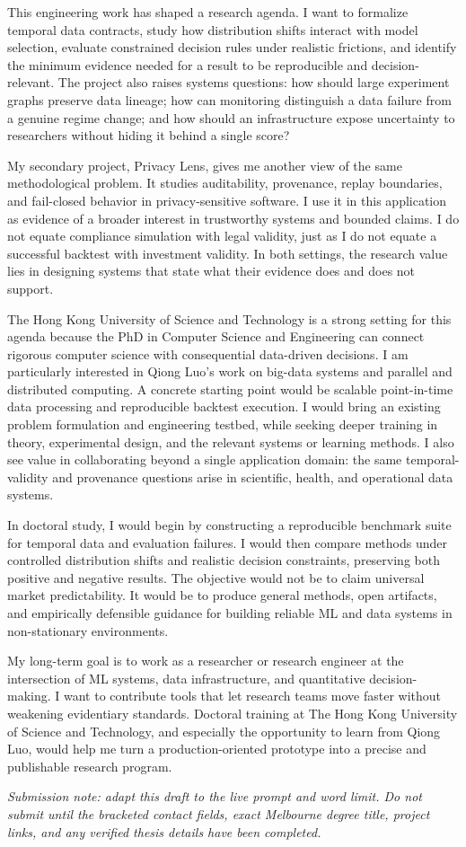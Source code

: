 \documentclass[11pt]{article}
\begin{document}
This engineering work has shaped a research agenda. I want to formalize temporal data contracts, study how distribution shifts interact with model selection, evaluate constrained decision rules under realistic frictions, and identify the minimum evidence needed for a result to be reproducible and decision-relevant. The project also raises systems questions: how should large experiment graphs preserve data lineage; how can monitoring distinguish a data failure from a genuine regime change; and how should an infrastructure expose uncertainty to researchers without hiding it behind a single score?

My secondary project, Privacy Lens, gives me another view of the same methodological problem. It studies auditability, provenance, replay boundaries, and fail-closed behavior in privacy-sensitive software. I use it in this application as evidence of a broader interest in trustworthy systems and bounded claims. I do not equate compliance simulation with legal validity, just as I do not equate a successful backtest with investment validity. In both settings, the research value lies in designing systems that state what their evidence does and does not support.

The Hong Kong University of Science and Technology is a strong setting for this agenda because the PhD in Computer Science and Engineering can connect rigorous computer science with consequential data-driven decisions. I am particularly interested in Qiong Luo's work on big-data systems and parallel and distributed computing. A concrete starting point would be scalable point-in-time data processing and reproducible backtest execution. I would bring an existing problem formulation and engineering testbed, while seeking deeper training in theory, experimental design, and the relevant systems or learning methods. I also see value in collaborating beyond a single application domain: the same temporal-validity and provenance questions arise in scientific, health, and operational data systems.

In doctoral study, I would begin by constructing a reproducible benchmark suite for temporal data and evaluation failures. I would then compare methods under controlled distribution shifts and realistic decision constraints, preserving both positive and negative results. The objective would not be to claim universal market predictability. It would be to produce general methods, open artifacts, and empirically defensible guidance for building reliable ML and data systems in non-stationary environments.

My long-term goal is to work as a researcher or research engineer at the intersection of ML systems, data infrastructure, and quantitative decision-making. I want to contribute tools that let research teams move faster without weakening evidentiary standards. Doctoral training at The Hong Kong University of Science and Technology, and especially the opportunity to learn from Qiong Luo, would help me turn a production-oriented prototype into a precise and publishable research program.

\textit{Submission note: adapt this draft to the live prompt and word limit. Do not submit until the bracketed contact fields, exact Melbourne degree title, project links, and any verified thesis details have been completed.}
\end{document}
